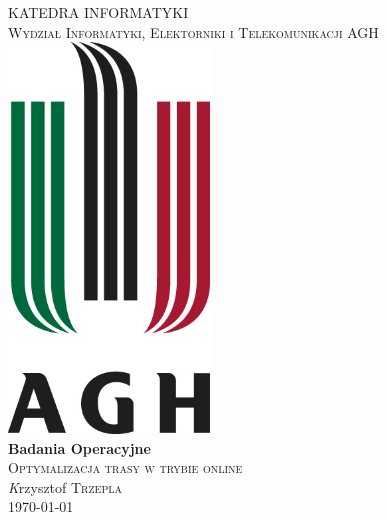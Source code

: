 \begin{titlepage}
\begin{center}

\textsc{\Huge KATEDRA INFORMATYKI}\\[1.0cm]
\textsc{\LARGE Wydział Informatyki, Elektorniki i Telekomunikacji AGH}\\[1.0cm]
\includegraphics[width=0.4\textwidth]{../images/logo}~\\[1cm]

{ \Huge \bfseries Badania Operacyjne}\\[0.5cm]
\textsc{\Large Optymalizacja trasy w trybie online}\\[1.0cm]

\emph Krzysztof \textsc{Trzepla} \\

\vfill
{\large \today}

\end{center}
\end{titlepage}
